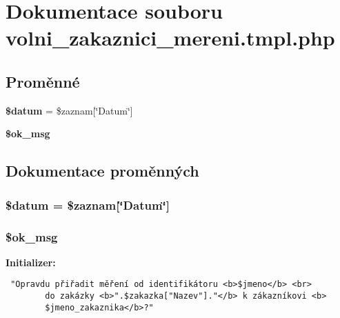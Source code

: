 \section{Dokumentace souboru volni\_\-zakaznici\_\-mereni.tmpl.php}
\label{volni__zakaznici__mereni_8tmpl_8php}
\subsection*{Proměnné}
\begin{CompactItemize}
\item 
{\bf \$datum} = \$zaznam[\char`\"{}Datum\char`\"{}]
\item 
{\bf \$ok\_\-msg}
\end{CompactItemize}


\subsection{Dokumentace proměnných}
\subsubsection{\setlength{\rightskip}{0pt plus 5cm}\$datum = \$zaznam[\char`\"{}Datum\char`\"{}]}\label{volni__zakaznici__mereni_8tmpl_8php_8577bf92daffc681075a34f87f9b8aca}


\subsubsection{\setlength{\rightskip}{0pt plus 5cm}\$ok\_\-msg}\label{volni__zakaznici__mereni_8tmpl_8php_3e83b005d81ab81551acbf315b016808}


\textbf{Initializer:}

\begin{Code}\begin{verbatim} "Opravdu přiřadit měření od identifikátoru <b>$jmeno</b> <br>
        do zakázky <b>".$zakazka["Nazev"]."</b> k zákazníkovi <b>
        $jmeno_zakaznika</b>?"
\end{verbatim}
\end{Code}
